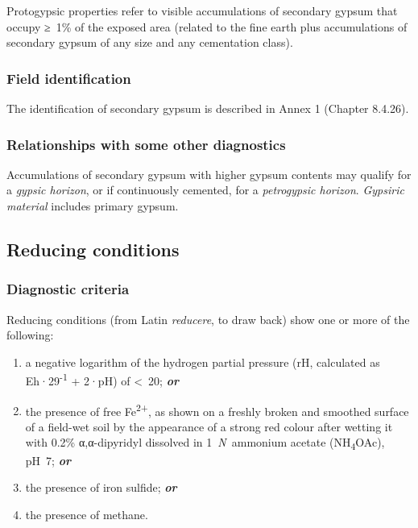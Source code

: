 \documentclass[
  letterpaper,
  DIV=11,
  numbers=noendperiod]{scrreprt}
\providecommand{\tightlist}{%
  \setlength{\itemsep}{0pt}\setlength{\parskip}{0pt}}\usepackage{longtable,booktabs,array}
\begin{document}
Protogypsic properties refer to visible accumulations of secondary
gypsum that occupy ≥~1\% of the exposed area (related to the fine earth
plus accumulations of secondary gypsum of any size and any cementation
class).

\hypertarget{field-identification-36}{%
\subsubsection{Field identification}\label{field-identification-36}}

The identification of secondary gypsum is described in Annex 1 (Chapter
8.4.26).

\hypertarget{relationships-with-some-other-diagnostics-44}{%
\subsubsection{Relationships with some other
diagnostics}\label{relationships-with-some-other-diagnostics-44}}

Accumulations of secondary gypsum with higher gypsum contents may
qualify for a \emph{gypsic horizon}, or if continuously cemented, for a
\emph{petrogypsic horizon}. \emph{Gypsiric material} includes primary
gypsum.

\hypertarget{reducing-conditions}{%
\subsection{Reducing conditions}\label{reducing-conditions}}

\hypertarget{diagnostic-criteria-49}{%
\subsubsection{Diagnostic criteria}\label{diagnostic-criteria-49}}

Reducing conditions (from Latin \emph{reducere}, to draw back) show one
or more of the following:

\begin{enumerate}
\def\labelenumi{\arabic{enumi}.}
\tightlist
\item
  a negative logarithm of the hydrogen partial pressure (rH, calculated
  as Eh·29\textsuperscript{-1} + 2·pH) of \textless~20;
  \textbf{\emph{or}}
\item
  the presence of free Fe\textsuperscript{2+}, as shown on a freshly
  broken and smoothed surface of a field-wet soil by the appearance of a
  strong red colour after wetting it with 0.2\% α,α-dipyridyl dissolved
  in 1~\emph{N}~ammonium acetate (NH\textsubscript{4}OAc), pH~7;
  \textbf{\emph{or}}
\item
  the presence of iron sulfide; \textbf{\emph{or}}
\item
  the presence of methane.
\end{enumerate}
\end{document}
